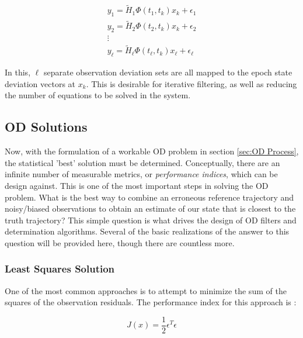 \documentclass[12pt,a4paper,oneside]{article}
\numberwithin{equation}{section}   		%
\begin{document}
\begin{eqnarray}
	y_1 = \tilde{H}_1 \Phi(t_1,t_k) x_k + \epsilon_1				\nonumber	\\
	y_2 = \tilde{H}_2 \Phi(t_2,t_k) x_k + \epsilon_2							\\
	\vdots											\nonumber	\\
	y_\ell = \tilde{H}_\ell \Phi(t_\ell,t_k) x_\ell + \epsilon_\ell		\nonumber
\end{eqnarray}

In this, $\ell$ separate observation deviation sets are all mapped to the epoch state deviation vectors at $x_k$. This is desirable for iterative filtering, as well as reducing the number of equations to be solved in the system. 


\subsection{OD Solutions}
\label{sec:OD Solutions}
Now, with the formulation of a workable OD problem in section \ref{sec:OD Process}, the statistical 'best' solution must be determined. Conceptually, there are an infinite number of measurable metrics, or \emph{performance indices}, which can be design against. This is one of the most important steps in solving the OD problem. What is the best way to combine an erroneous reference trajectory and noisy/biased observations to obtain an estimate of our state that is closest to the truth trajectory? This simple question is what drives the design of OD filters and determination algorithms. Several of the basic realizations of the answer to this question will be provided here, though there are countless more. 



\subsubsection{Least Squares Solution}
\label{OD sub Least Squares}
One of the most common approaches is to attempt to minimize the sum of the squares of the observation residuals. The performance index for this approach is \cite{tapley2004statistical}: 

\begin{equation}
	J(x) = \frac{1}{2 }\epsilon^T \epsilon
	\label{eq:Least Squares}
\end{equation}
\end{document}
